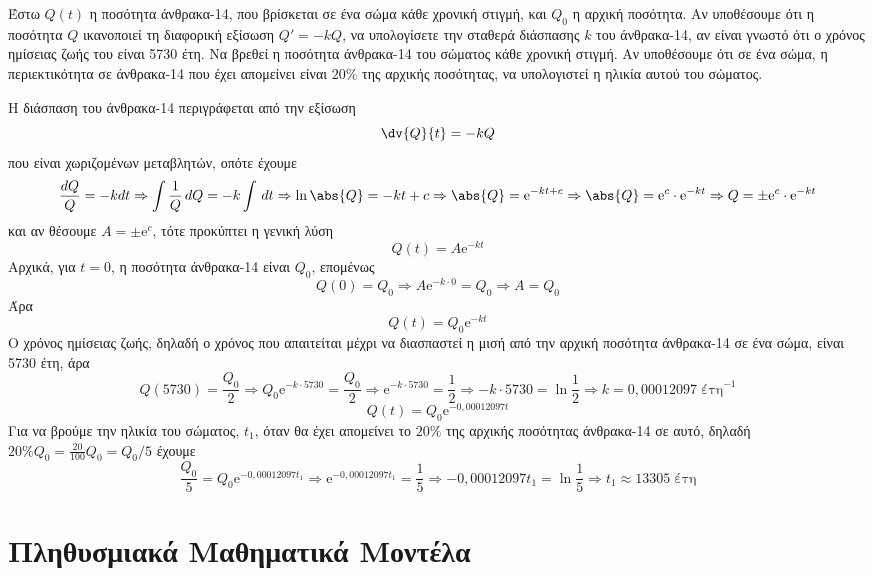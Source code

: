 \begin{problem}
  Έστω $ Q(t) $ η ποσότητα άνθρακα-14, που βρίσκεται σε ένα σώμα κάθε χρονική στιγμή,
  και $ Q_{0} $ η αρχική ποσότητα. Αν υποθέσουμε ότι η ποσότητα $Q$ ικανοποιεί τη 
  διαφορική εξίσωση $ Q' = -k Q $, να υπολογίσετε την σταθερά διάσπασης $k$ του 
  άνθρακα-14, αν είναι γνωστό ότι ο χρόνος ημίσειας ζωής του είναι 5730 έτη. 
  Να βρεθεί η ποσότητα άνθρακα-14 του σώματος κάθε χρονική στιγμή. 
  Αν υποθέσουμε ότι σε ένα σώμα, η περιεκτικότητα σε άνθρακα-14 που έχει απομείνει 
  είναι $ 20 \% $ της αρχικής ποσότητας, να υπολογιστεί η ηλικία αυτού του σώματος.
\end{problem}
\begin{solution}
  Η διάσπαση του άνθρακα-14 περιγράφεται από την εξίσωση 
  \[
    \dv{Q}{t} = -kQ 
  \] 
  που είναι χωριζομένων μεταβλητών, οπότε έχουμε
  \[ 
    \frac{dQ}{Q} = -k dt \Rightarrow \int \frac{1}{Q} \,{dQ} = -k \int \,{dt} 
    \Rightarrow \ln{\abs{Q}} = -kt + c \Rightarrow \abs{Q} = \mathrm{e}^{-kt+c} 
    \Rightarrow \abs{Q} = \mathrm{e}^{c} \cdot \mathrm{e}^{-kt} 
    \Rightarrow Q = \pm \mathrm{e}^{c} \cdot \mathrm{e}^{-kt}
  \]
  και αν θέσουμε $ A = \pm \mathrm{e}^{c} $, τότε προκύπτει η γενική λύση 
  \[
    Q(t) = A \mathrm{e}^{-kt} 
  \]
  Αρχικά, για $ t=0 $, η ποσότητα άνθρακα-14 είναι $Q_{0}$, επομένως
  \[
    Q(0) = Q_{0} \Rightarrow A \mathrm{e}^{-k\cdot 0} = Q_{0} \Rightarrow A = Q_{0}
  \] 
  Άρα 
  \[
    Q(t) = Q_{0}\mathrm{e}^{-kt} 
  \] 
  Ο χρόνος ημίσειας ζωής, δηλαδή ο χρόνος που απαιτείται μέχρι να διασπαστεί η 
  μισή από την αρχική ποσότητα άνθρακα-14 σε ένα σώμα, είναι 5730 έτη, άρα 
  \[
    Q(5730) = \frac{Q_{0}}{2} \Rightarrow Q_{0} \mathrm{e}^{-k\cdot 5730} = 
    \frac{Q_{0}}{2} \Rightarrow \mathrm{e}^{-k\cdot 5730} = \frac{1}{2} \Rightarrow 
    -k \cdot 5730 = \ln{\frac{1}{2}} \Rightarrow k = 0,00012097 \; \text{έτη}^{-1}
  \] 
  \[
    Q(t) = Q_{0} \mathrm{e}^{-0,00012097t} 
  \]
  Για να βρούμε την ηλικία του σώματος, $t_{1} $, όταν θα έχει απομείνει το 
  $ 20 \% $ της αρχικής ποσότητας άνθρακα-14 σε αυτό, δηλαδή 
  $ 20 \% Q_{0} = \frac{20}{100} Q_{0} = Q_{0}/5 $ 
  έχουμε
  \[
    \frac{Q_{0}}{5} = Q_{0} \mathrm{e}^{-0,00012097t_{1}} \Rightarrow 
    \mathrm{e}^{-0,00012097t_{1}} = \frac{1}{5} \Rightarrow -0,00012097t_{1} =
    \ln{\frac{1}{5}} \Rightarrow t_{1} \approx 13305 \; \text{έτη}
  \] 
\end{solution}

\section*{Πληθυσμιακά Μαθηματικά Μοντέλα}

